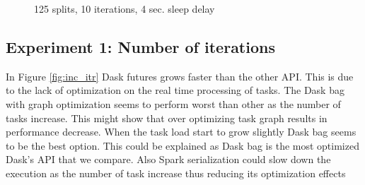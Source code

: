 \documentclass[11pt,a4paper]{article}
\begin{document}
\begin{figure}[p]
    \centering
    
    \caption{125 splits, 10 iterations, 4 sec. sleep delay}
    \label{fig:inc_node}
\end{figure}



\subsection{Experiment 1: Number of iterations}
In Figure \ref{fig:inc_itr} Dask futures grows faster than the other API. This is due to the lack of optimization on the real time processing of tasks. The Dask bag with graph optimization seems to perform worst than other as the number of tasks increase. This might show that over optimizing task graph results in performance decrease. When the task load start to grow slightly Dask bag seems to be the best option. This could be explained as Dask bag is the most optimized Dask's API that we compare. Also Spark serialization could slow down the execution as the number of task increase thus reducing its optimization effects
\end{document}
